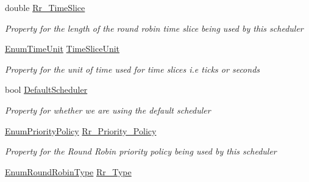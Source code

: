 \begin{DoxyCompactItemize}
double \hyperlink{class_c_p_u___o_s___simulator_1_1_operating___system_1_1_scheduler_ab21e8ffe8d0f06388cc2310d3dbb3b48}{Rr\+\_\+\+Time\+Slice}
\begin{DoxyCompactList}\small\item\em Property for the length of the round robin time slice being used by this scheduler \end{DoxyCompactList}\item 
\hyperlink{namespace_c_p_u___o_s___simulator_1_1_operating___system_a0553d0bc2513aec52caa769acf994d5c}{Enum\+Time\+Unit} \hyperlink{class_c_p_u___o_s___simulator_1_1_operating___system_1_1_scheduler_aaf31b58cc7c6e632c0ce7ca34612e1ba}{Time\+Slice\+Unit}
\begin{DoxyCompactList}\small\item\em Property for the unit of time used for time slices i.\+e ticks or seconds \end{DoxyCompactList}\item 
bool \hyperlink{class_c_p_u___o_s___simulator_1_1_operating___system_1_1_scheduler_acef6087d200a91657055a533ac0e3474}{Default\+Scheduler}
\begin{DoxyCompactList}\small\item\em Property for whether we are using the default scheduler \end{DoxyCompactList}\item 
\hyperlink{namespace_c_p_u___o_s___simulator_1_1_operating___system_a3a9286a473bd079e9c65908c0378fa00}{Enum\+Priority\+Policy} \hyperlink{class_c_p_u___o_s___simulator_1_1_operating___system_1_1_scheduler_aadb6b79c667cfd6baef113c44fb98f9e}{Rr\+\_\+\+Priority\+\_\+\+Policy}
\begin{DoxyCompactList}\small\item\em Property for the Round Robin priority policy being used by this scheduler \end{DoxyCompactList}\item 
\hyperlink{namespace_c_p_u___o_s___simulator_1_1_operating___system_a4c7effb8b6725df52018a3a14cede96e}{Enum\+Round\+Robin\+Type} \hyperlink{class_c_p_u___o_s___simulator_1_1_operating___system_1_1_scheduler_acc7c4b6c0383e4cf1a65251335f44e6d}{Rr\+\_\+\+Type}

\end{DoxyCompactItemize}
